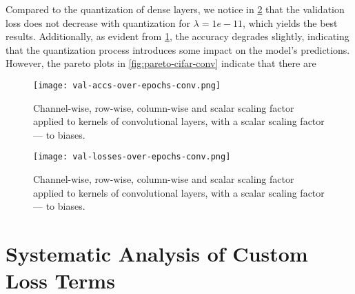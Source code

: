 Compared to the quantization of dense layers, we notice in \cref{fig:val-losses-over-epochs-conv} that the validation loss 
does not decrease with quantization for \( \lambda = 1e-11 \), which yields the 
best results. Additionally, as evident 
from \cref{fig:val-accs-over-epochs-conv}, the accuracy
degrades slightly, indicating that the quantization process introduces some impact on the model's predictions.
However, the pareto plots in \cref{fig:pareto-cifar-conv} indicate that
there are 

\begin{figure}[t!]
  \centering
  \texttt{[image: val-accs-over-epochs-conv.png]}
  \caption{Channel-wise, row-wise, column-wise and scalar scaling factor applied to kernels of convolutional layers, with a scalar scaling factor — to biases.}
  \label{fig:val-accs-over-epochs-conv}
\end{figure}

\begin{figure}[b!]
  \centering
  \texttt{[image: val-losses-over-epochs-conv.png]}
  \caption{Channel-wise, row-wise, column-wise and scalar scaling factor applied to kernels of convolutional layers, with a scalar scaling factor — to biases.}
  \label{fig:val-losses-over-epochs-conv}
\end{figure}

\section{Systematic Analysis of Custom Loss Terms}
\label{sec:dataset}

